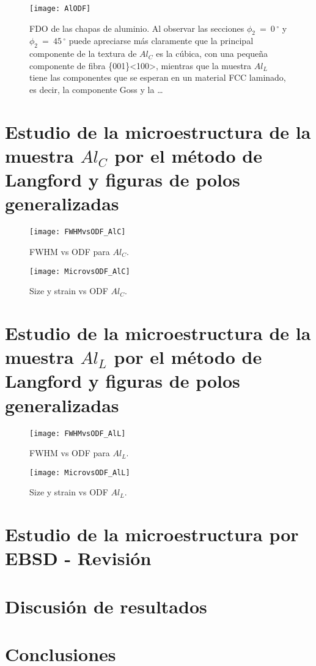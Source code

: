 \begin{figure}[!htb]
  \centering
  \texttt{[image: AlODF]}
  \caption{FDO de las chapas de aluminio. Al observar las secciones $\phi_2 \ = \ 0$\,$^{\circ}$ y $\phi_2 \ = \ 45$\,$^{\circ}$ puede apreciarse más claramente que la principal componente de la textura de $Al_C$ es la cúbica, con una pequeña componente de fibra \{001\}\textless 100\textgreater, mientras que la muestra $Al_L$ tiene las componentes que se esperan en un material FCC laminado, es decir, la componente Goss y la \ldots}
  \label{fig:AlODF}
\end{figure}

\newpage
\section{Estudio de la microestructura de la muestra $Al_C$ por el método de Langford y figuras de polos generalizadas}\label{S:AlCLANG}

\begin{figure}[!htb]
  \centering
  \texttt{[image: FWHMvsODF\_AlC]}
  \caption{FWHM vs ODF para $Al_C$.}
  \label{fig:AlCFWHMODF}
\end{figure}

\begin{figure}[!htb]
  \centering
  \texttt{[image: MicrovsODF\_AlC]}
  \caption{Size y strain vs ODF $Al_C$.}
  \label{fig:AlCMicro}
\end{figure}

\newpage
\section{Estudio de la microestructura de la muestra $Al_L$ por el método de Langford y figuras de polos generalizadas}\label{S:AlLLANG}
\begin{figure}[!htb]
  \centering
  \texttt{[image: FWHMvsODF\_AlL]}
  \caption{FWHM vs ODF para $Al_L$.}
  \label{fig:AlLFWHMODF}
\end{figure}

\begin{figure}[!htb]
  \centering
  \texttt{[image: MicrovsODF\_AlL]}
  \caption{Size y strain vs ODF $Al_L$.}
  \label{fig:AlLMicro}
\end{figure}

\newpage
\section{Estudio de la microestructura por EBSD - Revisión}\label{S:AlEBSD}
\section{Discusión de resultados}\label{S:AlDis}
\section{Conclusiones}\label{S:AlConclusiones}
